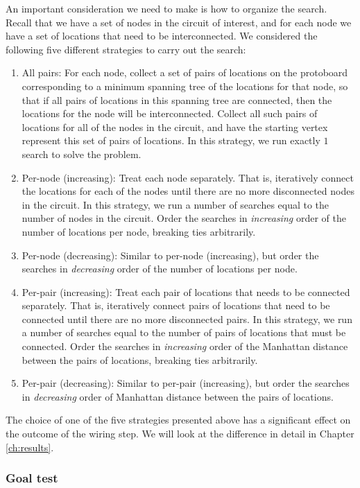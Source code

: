 An important consideration we need to make is how to organize the
search. Recall that we have a set of nodes in the circuit of interest, and for
each node we have a set of locations that need to be interconnected.
We considered the following five different strategies to carry out the search:

\begin{enumerate}
\item All pairs: For each node, collect a set of pairs of locations on the
protoboard
corresponding to a minimum spanning tree of the locations for that node, so that
if all pairs of locations in this spanning tree are connected, then the
locations for the node will be interconnected. Collect all such pairs of
locations for all of the nodes in the circuit, and have the starting vertex
represent
this set of pairs of locations. In this strategy, we run exactly $1$ search to
solve the problem.
\item Per-node (increasing): Treat each node separately. That is, iteratively
connect the locations for each of the nodes until there are no more disconnected
nodes in the circuit. In this strategy, we run a number of searches equal to the
number of nodes in the circuit. Order the searches in
\emph{increasing} order of the number of locations per node, breaking ties
arbitrarily.
\item Per-node (decreasing): Similar to per-node (increasing), but order the
searches in \emph{decreasing} order of the number of locations per node.
\item Per-pair (increasing): Treat each pair of locations that needs to be
connected separately. That is, iteratively connect pairs of locations that need
to be connected until there are no more disconnected pairs.
In this strategy, we run a number of searches equal to the number of pairs of
locations that must be connected. Order the searches in \emph{increasing} order
of the Manhattan distance between the pairs of locations, breaking ties
arbitrarily.
\item Per-pair (decreasing): Similar to per-pair (increasing), but order the
searches in \emph{decreasing} order of Manhattan distance between the pairs of
locations.
\end{enumerate}

The choice of one of the five strategies presented above
has a significant effect on the outcome of the wiring step.
We will look at the difference in detail in Chapter \ref{ch:results}.

\subsubsection{Goal test}

